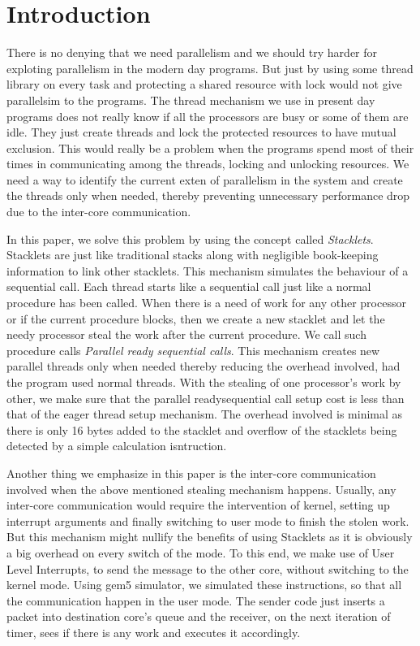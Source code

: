 \section{Introduction}

There is no denying that we need parallelism and we should try harder for 
exploting parallelism in the modern day programs. But just by using some
thread library on every task and protecting a shared resource with lock
would not give parallelsim to the programs. The thread mechanism we use in
present day programs does not really know if all the processors are busy or
some of them are idle. They just create threads and lock the protected
resources to have mutual exclusion. This would really be a problem when the
programs spend most of their times in communicating among the threads, locking
and unlocking resources. We need a way to identify the current exten of 
parallelism in the system and create the threads only when needed, thereby
preventing unnecessary performance drop due to the inter-core communication.

In this paper, we solve this problem by using the concept called \textit{Stacklets}.
Stacklets are just like traditional stacks along with negligible book-keeping
information to link other stacklets. This mechanism simulates the behaviour of
a sequential call. Each thread starts like a sequential call just like a normal
procedure has been called. When there is a need of work for any other processor
or if the current procedure blocks, then we create a new stacklet and let the
needy processor steal the work after the current procedure. We call such
procedure calls \textit{Parallel ready sequential calls}. This mechanism
creates new parallel threads only when needed thereby reducing the overhead
involved, had the program used normal threads. With the stealing of one
processor's work by other, we make sure that the parallel readysequential call
setup cost is less than that of the eager thread setup mechanism. The overhead
involved is minimal as there is only 16 bytes added to the stacklet and
overflow of the stacklets being detected by a simple calculation isntruction.

Another thing we emphasize in this paper is the inter-core communication
involved when the above mentioned stealing mechanism happens. Usually, any
inter-core communication would require the intervention of kernel, setting up
interrupt arguments and finally switching to user mode to finish the stolen
work. But this mechanism might nullify the benefits of using Stacklets as it
is obviously a big overhead on every switch of the mode. To this end, we make
use of User Level Interrupts, to send the message to the other core, without
switching to the kernel mode. Using gem5 simulator, we simulated these
instructions, so that all the communication happen in the user mode. The sender
code just inserts a packet into destination core's queue and the receiver,
on the next iteration of timer, sees if there is any work and executes it
accordingly.

